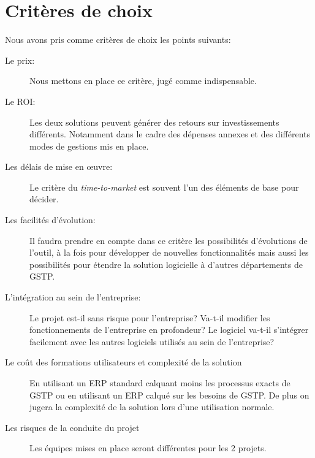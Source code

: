 \section{Critères de choix}

Nous avons pris comme critères de choix les points suivants: 

\begin{description}
    \item  [Le prix:]\el
	Nous mettons en place ce critère, jugé comme indispensable.

    \item [Le ROI:]\el
	Les deux solutions peuvent générer des retours sur investissements
différents. Notamment dans le cadre des dépenses annexes et des différents
modes de gestions mis en place.

    \item [Les délais de mise en \oe{}uvre:]\el
	Le critère du {\sl time-to-market} est souvent l'un des éléments de
base pour décider.

    \item [Les facilités d'évolution:]\el
	Il faudra prendre en compte dans ce critère les possibilités d'évolutions 
de l'outil, à la fois pour développer de nouvelles fonctionnalités mais aussi 
les possibilités pour étendre la solution logicielle à d'autres départements de
GSTP.

    \item [L'intégration au sein de l'entreprise:]\el
	Le projet est-il sans risque pour l'entreprise? Va-t-il modifier les
fonctionnements de l'entreprise en profondeur? Le logiciel va-t-il s'intégrer
facilement avec les autres logiciels utilisés au sein de l'entreprise?

    \item [Le coût des formations utilisateurs et complexité de la solution]\el
	En utilisant un ERP standard calquant moins les processus exacts de GSTP ou 
en utilisant un ERP calqué sur les besoins de GSTP. De plus on jugera la
complexité de la solution lors d'une utilisation normale.

    \item [Les risques de la conduite du projet]\el
	Les équipes mises en place seront différentes pour les 2 projets.

\end{description}


	
